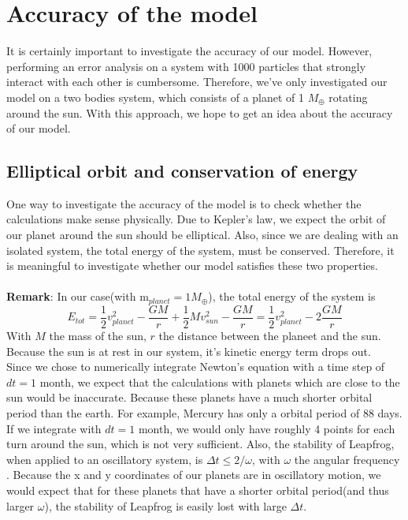 \section{Accuracy of the model}
It is certainly important to investigate the accuracy of our model. However, performing an error analysis on a system with 1000 particles that strongly interact with each other is cumbersome. Therefore, we've only investigated our model on a two bodies system, which consists of a planet of 1 $M_{\oplus}$ rotating around the sun. With this approach, we hope to get an idea about the accuracy of our model.
\subsection{Elliptical orbit and conservation of energy}
One way to investigate the accuracy of the model is to check whether the calculations make sense physically. Due to Kepler's law, we expect the orbit of our planet around the sun should be elliptical. Also, since we are dealing with an isolated system, the total energy of the system, must be conserved. Therefore, it is meaningful to investigate whether our model satisfies these two properties.\\ 
\\
\textbf{Remark}: In our case(with $\text{m}_{planet}=1 M_{\oplus}$), the total energy of the system is \cite{Energy}
\[E_{tot}=\frac{1}{2}v_{planet}^2-\frac{GM}{r}+\frac{1}{2}Mv_{sun}^2-\frac{GM}{r}=\frac{1}{2}v_{planet}^2-2\frac{GM}{r}\]
With $M$ the mass of the sun, $r$ the distance between the planeet and the sun. Because the sun is at rest in our system, it's kinetic energy term drops out.\\


Since we chose to numerically integrate Newton's equation with a time step of $dt=1$ month, we expect that the calculations with planets which are close to the sun would be inaccurate. Because these planets have a much shorter orbital period than the earth. For example, Mercury has only a orbital period of 88 days. If we integrate with $dt=1$ month, we would only have roughly 4 points for each turn around the sun, which is not very sufficient. Also, the stability of Leapfrog, when applied to an oscillatory system, is $\Delta t\leq 2/\omega$, with $\omega$ the angular frequency \cite{StabLeapfrog}. Because the x and y coordinates of our planets are in oscillatory motion, we would expect that for these planets that have a shorter orbital period(and thus larger $\omega$), the stability of Leapfrog is easily lost with large $\Delta t$.\\

